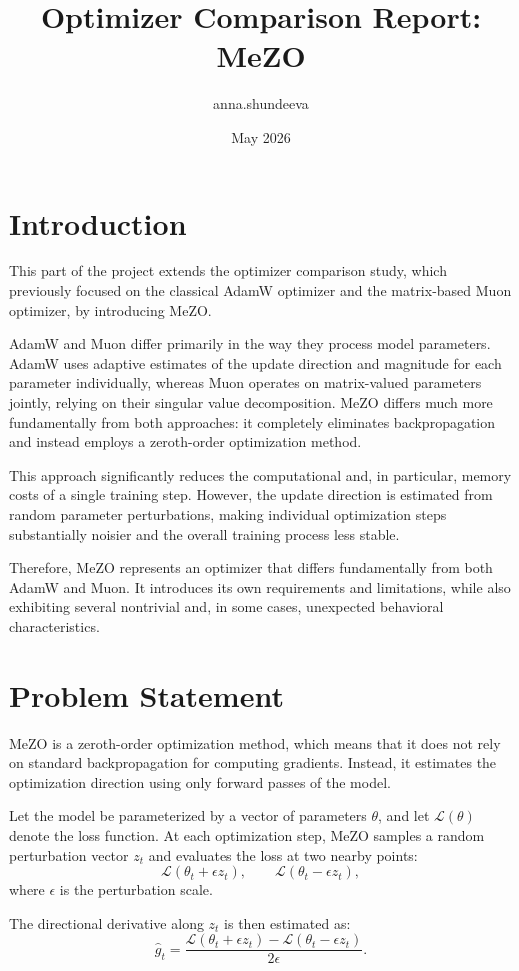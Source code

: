\documentclass{article}
\title{Optimizer Comparison Report: MeZO}
\author{anna.shundeeva}
\date{May 2026}
\begin{document}
\maketitle

\section{Introduction}
This part of the project extends the optimizer comparison study, which previously focused on the classical AdamW optimizer and the matrix-based Muon optimizer, by introducing MeZO.

AdamW and Muon differ primarily in the way they process model parameters. AdamW uses adaptive estimates of the update direction and magnitude for each parameter individually, whereas Muon operates on matrix-valued parameters jointly, relying on their singular value decomposition. MeZO differs much more fundamentally from both approaches: it completely eliminates backpropagation and instead employs a zeroth-order optimization method.

This approach significantly reduces the computational and, in particular, memory costs of a single training step. However, the update direction is estimated from random parameter perturbations, making individual optimization steps substantially noisier and the overall training process less stable.

Therefore, MeZO represents an optimizer that differs fundamentally from both AdamW and Muon. It introduces its own requirements and limitations, while also exhibiting several nontrivial and, in some cases, unexpected behavioral characteristics.

\section{Problem Statement}
MeZO is a zeroth-order optimization method, which means that it does not rely on standard backpropagation for computing gradients. Instead, it estimates the optimization direction using only forward passes of the model.

Let the model be parameterized by a vector of parameters $\theta$, and let $\mathcal{L}(\theta)$ denote the loss function. At each optimization step, MeZO samples a random perturbation vector $z_t$ and evaluates the loss at two nearby points:
\[
\mathcal{L}(\theta_t + \epsilon z_t),
\qquad
\mathcal{L}(\theta_t - \epsilon z_t),
\]
where $\epsilon$ is the perturbation scale.

The directional derivative along $z_t$ is then estimated as:
\[
\hat{g}_t =
\frac{
\mathcal{L}(\theta_t + \epsilon z_t)
-
\mathcal{L}(\theta_t - \epsilon z_t)
}{
2\epsilon
}.
\]
\end{document}
